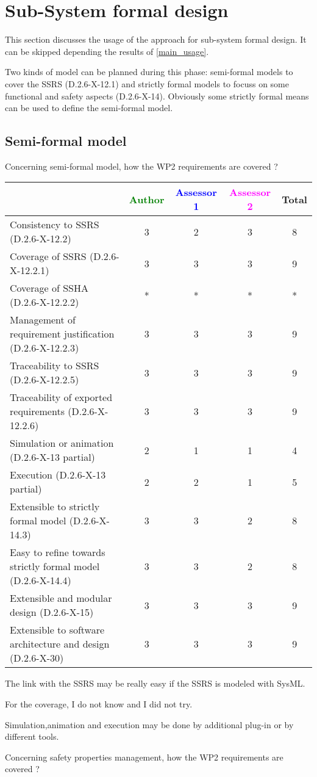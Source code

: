 \section{Sub-System formal design}
This section discusses the usage of the approach for sub-system formal design.
It can be skipped depending the results of \ref{main_usage}.

Two kinds of model can be planned during this phase: semi-formal models to  cover the SSRS (D.2.6-X-12.1) and strictly formal  models to  focuss on some functional and safety aspects (D.2.6-X-14).  Obviously some strictly  formal means can be used to define the semi-formal  model.

\subsection{Semi-formal model}

Concerning semi-formal model, how the WP2 requirements are covered ?

\begin{tabular}{|l | c | c | c | c|}
\hline
& \textcolor{green}{Author} & \textcolor{blue}{Assessor 1} & \textcolor{magenta}{Assessor 2} & Total \\
\hline 
Consistency to SSRS (D.2.6-X-12.2) &3 &2 & 3& 8 \\
\hline
Coverage of SSRS (D.2.6-X-12.2.1)  &3 & 3& 3& 9 \\
\hline
Coverage of SSHA (D.2.6-X-12.2.2)  & * & *& *& * \\
\hline
Management of requirement justification (D.2.6-X-12.2.3)  &3 & 3& 3& 9 \\
\hline
Traceability to  SSRS (D.2.6-X-12.2.5)  & 3 & 3& 3& 9 \\
\hline
Traceability of exported requirements (D.2.6-X-12.2.6)  &3 & 3& 3& 9 \\
\hline
Simulation or animation (D.2.6-X-13 partial)  &2 & 1& 1& 4  \\
\hline
Execution (D.2.6-X-13 partial)  &2 & 2& 1& 5 \\
\hline
Extensible to strictly formal model (D.2.6-X-14.3) &3 & 3& 2& 8 \\
\hline
Easy to  refine towards strictly formal model (D.2.6-X-14.4) &3 & 3& 2& 8 \\
\hline
Extensible and modular design (D.2.6-X-15)  &3 & 3& 3& 9 \\
\hline
Extensible to software architecture and design (D.2.6-X-30)   &3 & 3& 3& 9 \\
\hline
\end{tabular}
\begin{author_comment}
The link with the SSRS may be really easy if the SSRS is modeled
with SysML.

For the coverage, I do not know and I did not try.


Simulation,animation  and execution may be done by additional plug-in
or by different tools.
\end{author_comment}
Concerning safety properties management, how the WP2 requirements are covered ?

